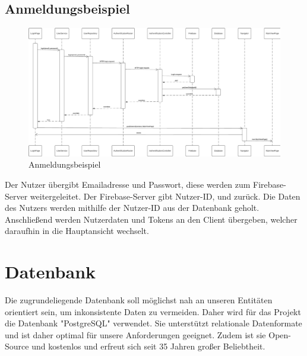 \documentclass{entwurfsheft}
\begin{document}
\begin{sloppypar}
\subsection{Anmeldungsbeispiel}
\begin{figure}[htp]
    \centering
    \includegraphics[width = \linewidth]{images/firebase/sqd_login.pdf}
    \caption{Anmeldungsbeispiel}
\end{figure}
Der Nutzer übergibt Emailadresse und Passwort, diese werden zum Firebase-Server weitergeleitet. Der Firebase-Server gibt Nutzer-ID,  und  zurück. Die Daten des Nutzers werden mithilfe der Nutzer-ID aus der Datenbank geholt. Anschließend werden Nutzerdaten und Tokens an den Client übergeben, welcher daraufhin in die Hauptansicht wechselt.

\newpage

\section{Datenbank}
Die zugrundeliegende Datenbank soll möglichst nah an unseren Entitäten orientiert sein, um inkonsistente Daten zu vermeiden. Daher wird für das Projekt die Datenbank "PostgreSQL" verwendet. Sie unterstützt relationale Datenformate und ist daher optimal für unsere Anforderungen geeignet. Zudem ist sie Open-Source und kostenlos und erfreut sich seit 35 Jahren großer Beliebtheit.

\end{sloppypar}
\end{document}

